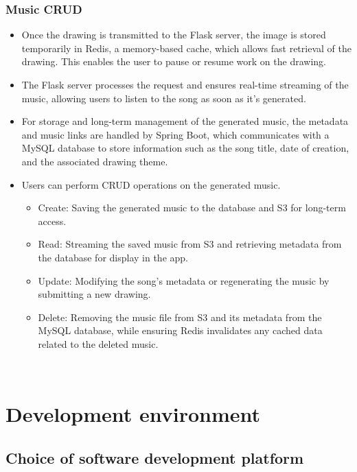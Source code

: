 \documentclass[conference]{IEEEtran}
\begin{document}
\subsubsection{Music CRUD}
\begin{itemize}
    \item Once the drawing is transmitted to the Flask server, the image is stored temporarily in Redis, a memory-based cache, which allows fast retrieval of the drawing. This enables the user to pause or resume work on the drawing.\\
    \item The Flask server processes the request and ensures real-time streaming of the music, allowing users to listen to the song as soon as it's generated.\\
    \item For storage and long-term management of the generated music, the metadata and music links are handled by Spring Boot, which communicates with a MySQL database to store information such as the song title, date of creation, and the associated drawing theme.\\
    \item Users can perform CRUD operations on the generated music.
\begin{itemize}
    \item Create: Saving the generated music to the database and S3 for long-term access.\\
    \item Read: Streaming the saved music from S3 and retrieving metadata from the database for display in the app.\\
    \item Update: Modifying the song’s metadata or regenerating the music by submitting a new drawing.\\
    \item Delete: Removing the music file from S3 and its metadata from the MySQL database, while ensuring Redis invalidates any cached data related to the deleted music.\\
\end{itemize}
\end{itemize}

\

\section{Development environment}

\subsection{Choice of software development platform}
\end{document}

